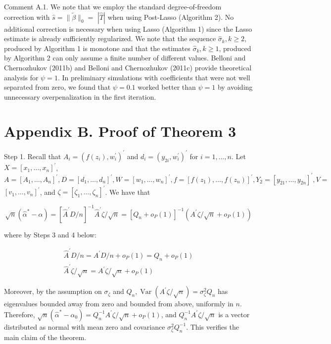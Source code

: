 \documentclass[10pt]{article}
\begin{document}
Comment A.1. We note that we employ the standard degree-of-freedom correction with \(\widehat{s}=\|\widetilde{\beta}\|_{0}=\) \(|\widehat{T}|\) when using Post-Lasso (Algorithm 2). No additional correction is necessary when using Lasso (Algorithm 1) since the Lasso estimate is already sufficiently regularized. We note that the sequence \(\widehat{\sigma}_{k}, k \geqslant 2\), produced by Algorithm 1 is monotone and that the estimates \(\widehat{\sigma}_{k}, k \geqslant 1\), produced by Algorithm 2 can only assume a finite number of different values. Belloni and Chernozhukov (2011b) and Belloni and Chernozhukov (2011c) provide theoretical analysis for \(\psi=1\). In preliminary simulations with coefficients that were not well separated from zero, we found that \(\psi=0.1\) worked better than \(\psi=1\) by avoiding unnecessary overpenalization in the first iteration.

\section*{Appendix B. Proof of Theorem 3}
Step 1. Recall that \(A_{i}=\left(f\left(z_{i}\right), w_{i}^{\prime}\right)^{\prime}\) and \(d_{i}=\left(y_{2 i}, w_{i}^{\prime}\right)^{\prime}\) for \(i=1, \ldots, n\). Let \(X=\left[x_{1}, \ldots, x_{n}\right]^{\prime}\), \(A=\left[A_{1}, \ldots, A_{n}\right]^{\prime}, D=\left[d_{1}, \ldots, d_{n}\right]^{\prime}, W=\left[w_{1}, \ldots, w_{n}\right]^{\prime}, f=\left[f\left(z_{1}\right), \ldots, f\left(z_{n}\right)\right]^{\prime}, Y_{2}=\left[y_{21}, \ldots, y_{2 n}\right]^{\prime}, V=\) \(\left[v_{1}, \ldots, v_{n}\right]^{\prime}\), and \(\zeta=\left[\zeta_{1}, \ldots, \zeta_{n}\right]^{\prime}\). We have that

\[
\sqrt{n}\left(\widehat{\alpha}^{*}-\alpha\right)=\left[\widehat{A}^{\prime} D / n\right]^{-1} \widehat{A}^{\prime} \zeta / \sqrt{n}=\left[Q_{n}+o_{P}(1)\right]^{-1}\left(A^{\prime} \zeta / \sqrt{n}+o_{P}(1)\right)
\]

where by Steps 3 and 4 below:

\[
\begin{gathered}
\widehat{A}^{\prime} D / n=A^{\prime} D / n+o_{P}(1)=Q_{n}+o_{P}(1) \\
\widehat{A}^{\prime} \zeta / \sqrt{n}=A^{\prime} \zeta / \sqrt{n}+o_{P}(1)
\end{gathered}
\]

Moreover, by the assumption on \(\sigma_{\zeta}\) and \(Q_{n}, \operatorname{Var}\left(A^{\prime} \zeta / \sqrt{n}\right)=\sigma_{\zeta}^{2} Q_{n}\) has eigenvalues bounded away from zero and bounded from above, uniformly in \(n\). Therefore, \(\sqrt{n}\left(\widehat{\alpha}^{*}-\alpha_{0}\right)=Q_{n}^{-1} A^{\prime} \zeta / \sqrt{n}+o_{P}(1)\), and \(Q_{n}^{-1} A^{\prime} \zeta / \sqrt{n}\) is a vector distributed as normal with mean zero and covariance \(\sigma_{\zeta}^{2} Q_{n}^{-1}\). This verifies the main claim of the theorem.
\end{document}
